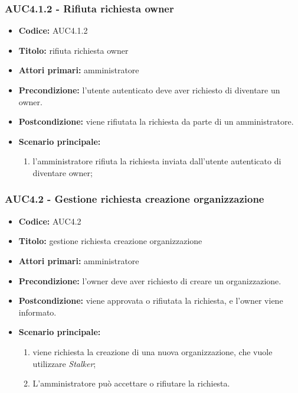 \documentclass[casi-duso]{subfiles}
\begin{document}
\subsubsection{AUC4.1.2 - Rifiuta richiesta owner}%
\label{subsub:AUC4.1.2}
\begin{itemize}
  \item \textbf{Codice:} AUC4.1.2
  \item \textbf{Titolo:} rifiuta richiesta owner
  \item \textbf{Attori primari:} amministratore
  \item \textbf{Precondizione:} l'utente autenticato deve aver richiesto di diventare un owner.
  \item \textbf{Postcondizione:} viene rifiutata la richiesta da parte di un amministratore.
  \item \textbf{Scenario principale:}
  \begin{enumerate}
    \item l'amministratore rifiuta la richiesta inviata dall'utente autenticato di diventare owner;
  \end{enumerate}
\end{itemize}

\subsubsection{AUC4.2 - Gestione richiesta creazione organizzazione}%
\label{subsub:AUC4.2}
\begin{itemize}
  \item \textbf{Codice:} AUC4.2
  \item \textbf{Titolo:} gestione richiesta creazione organizzazione
  \item \textbf{Attori primari:} amministratore
  \item \textbf{Precondizione:} l'owner deve aver richiesto di creare un organizzazione.
  \item \textbf{Postcondizione:} viene approvata o rifiutata la richiesta, e l'owner viene informato.
  \item \textbf{Scenario principale:}
  \begin{enumerate}
    \item viene richiesta la creazione di una nuova organizzazione, che vuole utilizzare \emph{Stalker};
    \item L'amministratore può accettare o rifiutare la richiesta.
  \end{enumerate}
\end{itemize}
\end{document}
